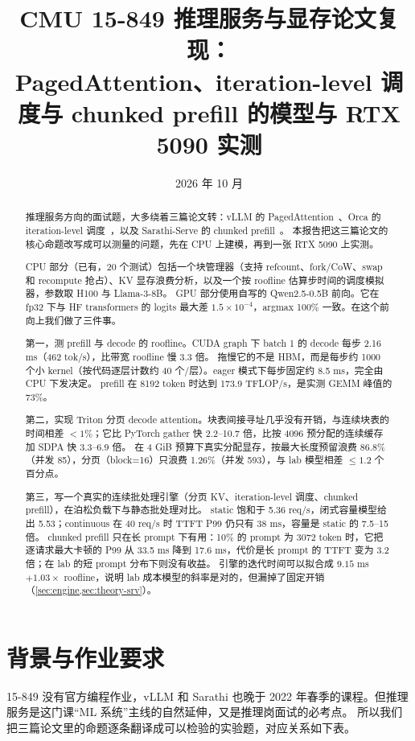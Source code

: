 \documentclass[11pt,a4paper]{ctexart}
\title{CMU 15-849 推理服务与显存论文复现：\\PagedAttention、iteration-level 调度与 chunked prefill 的模型与 RTX 5090 实测}
\author{\authorline}
\date{2026 年 10 月}
\begin{document}
\maketitle

\begin{abstract}
推理服务方向的面试题，大多绕着三篇论文转：vLLM 的 PagedAttention~\cite{kwon2023}、Orca 的 iteration-level 调度~\cite{yu2022}，以及 Sarathi-Serve 的 chunked prefill~\cite{agrawal2024}。
本报告把这三篇论文的核心命题改写成可以测量的问题，先在 CPU 上建模，再到一张 RTX 5090 上实测。

CPU 部分（已有，20 个测试）包括一个块管理器（支持 refcount、fork/CoW、swap 和 recompute 抢占）、KV 显存浪费分析，以及一个按 roofline 估算步时间的调度模拟器，参数取 H100 与 Llama-3-8B。
GPU 部分使用自写的 Qwen2.5-0.5B 前向。它在 fp32 下与 HF transformers 的 logits 最大差 $1.5\times10^{-4}$，argmax 100\% 一致。在这个前向上我们做了三件事。

第一，测 prefill 与 decode 的 roofline。CUDA graph 下 batch 1 的 decode 每步 2.16 ms（462 tok/s），比带宽 roofline 慢 3.3 倍。
拖慢它的不是 HBM，而是每步约 1000 个小 kernel（按代码逐层计数约 40 个/层）。eager 模式下每步固定约 8.5 ms，完全由 CPU 下发决定。
prefill 在 8192 token 时达到 173.9 TFLOP/s，是实测 GEMM 峰值的 73\%。

第二，实现 Triton 分页 decode attention。块表间接寻址几乎没有开销，与连续块表的时间相差 $<1\%$；它比 PyTorch gather 快 2.2--10.7 倍，比按 4096 预分配的连续缓存加 SDPA 快 3.3--6.9 倍。
在 4 GiB 预算下真实分配显存，按最大长度预留浪费 86.8\%（并发 85），分页（block=16）只浪费 1.26\%（并发 593），与 lab 模型相差 $\le1.2$ 个百分点。

第三，写一个真实的连续批处理引擎（分页 KV、iteration-level 调度、chunked prefill），在泊松负载下与静态批处理对比。
static 饱和于 5.36 req/s，闭式容量模型给出 5.53；continuous 在 40 req/s 时 TTFT P99 仍只有 38 ms，容量是 static 的 7.5--15 倍。
chunked prefill 只在长 prompt 下有用：10\% 的 prompt 为 3072 token 时，它把逐请求最大卡顿的 P99 从 33.5 ms 降到 17.6 ms，代价是长 prompt 的 TTFT 变为 3.2 倍；在 lab 的短 prompt 分布下则没有收益。
引擎的迭代时间可以拟合成 $9.15$ ms $+1.03\times$ roofline，说明 lab 成本模型的斜率是对的，但漏掉了固定开销（\cref{sec:engine,sec:theory-srv}）。
\end{abstract}

\tableofcontents
\newpage

\section{背景与作业要求}
15-849 没有官方编程作业，vLLM 和 Sarathi 也晚于 2022 年春季的课程。但推理服务是这门课“ML 系统”主线的自然延伸，又是推理岗面试的必考点。
所以我们把三篇论文里的命题逐条翻译成可以检验的实验题，对应关系如下表。
\end{document}

